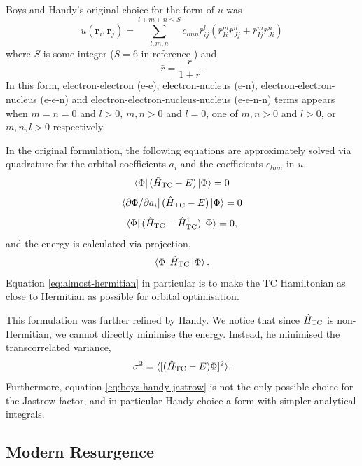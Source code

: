 Boys and Handy's original choice for the form of $u$ was
\begin{equation}
    \label{eq:boys-handy-jastrow}
    u(\bm r_i, \bm r_j) = \sum_{l,m,n}^{l+m+n\leq S} c_{lmn}\bar r_{ij}^l(\bar r_{Ii}^m\bar r_{Jj}^n + \bar r_{Ij}^m\bar r_{Ji}^n)
\end{equation}
where $S$ is some integer ($S=6$ in reference ) and
\begin{equation}
    \bar r = \frac{r}{1+r}.
\end{equation}
In this form, electron-electron (e-e), electron-nucleus (e-n), electron-electron-nucleus (e-e-n) and electron-electron-nucleus-nucleus (e-e-n-n) terms appears when $m=n=0$ and $l>0$, $m,n>0$ and $l=0$, one of $m,n>0$ and $l>0$, or $m,n,l>0$ respectively.

In the original formulation, the following equations are approximately solved via quadrature for the orbital coefficients $a_i$ and the coefficients $c_{lmn}$ in $u$.
\begin{equation}
    \bra\Phi(\hat H_\mathrm{TC} - E)\ket\Phi = 0
\end{equation}
\begin{equation}
    \bra{\partial\Phi/\partial a_i}(\hat H_\mathrm{TC} - E)\ket\Phi = 0
\end{equation}
\begin{equation}
    \label{eq:almost-hermitian}
    \bra\Phi(\hat H_\mathrm{TC} - \hat H_\mathrm{TC}^\dag)\ket\Phi = 0,
\end{equation}
and the energy is calculated via projection,
\begin{equation}
    \bra\Phi\hat H_\mathrm{TC}\ket\Phi.
\end{equation}
Equation \ref{eq:almost-hermitian} in particular is to make the TC Hamiltonian as close to Hermitian as possible for orbital optimisation.

This formulation was further refined by Handy. We notice that since $\hat H_\mathrm{TC}$ is non-Hermitian, we cannot directly minimise the energy. Instead, he minimised the transcorrelated variance,
\begin{equation}
    \sigma^2 = \langle [(\hat H_\mathrm{TC} - E)\Phi]^2\rangle.
\end{equation}
Furthermore, equation \ref{eq:boys-handy-jastrow} is not the only possible choice for the Jastrow factor, and in particular Handy choice a form with simpler analytical integrals.


\subsection{Modern Resurgence}

